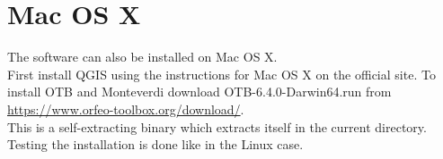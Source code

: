 \documentclass[10pt,a4paper]{article}
\begin{document}
\clearpage
\section{Mac OS X}

The software can also be installed on Mac OS X. \\

First install QGIS using the instructions for Mac OS X on the official site. To install OTB and  Monteverdi download 
OTB-6.4.0-Darwin64.run from \url{https://www.orfeo-toolbox.org/download/}. \\

This is a self-extracting binary which extracts itself in the current directory. Testing the installation is done like in the Linux case.
\end{document}
